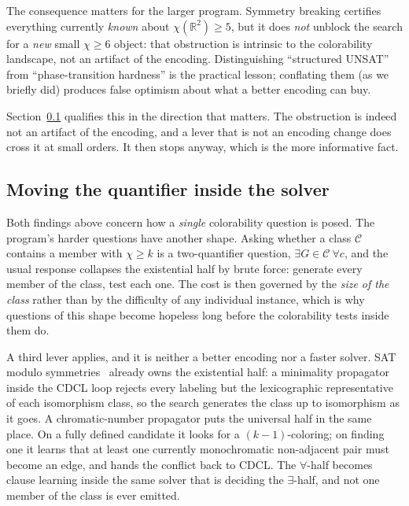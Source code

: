 \documentclass[11pt]{article}
\theoremstyle{definition}
\newcommand{\R}{\mathbb{R}}
\newcommand{\chrom}{\chi}
\begin{document}
The consequence matters for the larger program. Symmetry breaking certifies
everything currently \emph{known} about $\chrom(\R^2) \ge 5$, but it does
\emph{not} unblock the search for a \emph{new} small $\chrom \ge 6$ object: that
obstruction is intrinsic to the colorability landscape, not an artifact of the
encoding. Distinguishing ``structured UNSAT'' from ``phase-transition hardness''
is the practical lesson; conflating them (as we briefly did) produces false
optimism about what a better encoding can buy.

Section~\ref{sec:sigma2} qualifies this in the direction that matters. The
obstruction is indeed not an artifact of the encoding, and a lever that is not an
encoding change does cross it at small orders. It then stops anyway, which is the
more informative fact.

\subsection{Moving the quantifier inside the solver}
\label{sec:sigma2}

Both findings above concern how a \emph{single} colorability question is posed.
The program's harder questions have another shape. Asking whether a class
$\mathcal{C}$ contains a member with $\chrom \ge k$ is a two-quantifier question,
$\exists G \in \mathcal{C}\ \forall c$, and the usual response collapses the
existential half by brute force: generate every member of the class, test each
one. The cost is then governed by the \emph{size of the class} rather than by the
difficulty of any individual instance, which is why questions of this shape become
hopeless long before the colorability tests inside them do.

A third lever applies, and it is neither a better encoding nor a faster solver.
SAT modulo symmetries~\cite{KirchwegerSzeider2021} already owns the existential
half: a minimality propagator inside the CDCL loop rejects every labeling but the
lexicographic representative of each isomorphism class, so the search generates
the class up to isomorphism as it goes. A chromatic-number propagator puts the
universal half in the same place. On a fully defined candidate it looks for a
$(k-1)$-coloring; on finding one it learns that at least one currently
monochromatic non-adjacent pair must become an edge, and hands the conflict back
to CDCL. The $\forall$-half becomes clause learning inside the same solver that is
deciding the $\exists$-half, and not one member of the class is ever emitted.
\end{document}
